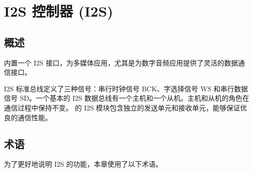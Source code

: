 \documentclass[main\_\_CN.tex]{subfiles}
\begin{document}

\ifglobal
\else
    {\let\clearpage\relax \listoftodos}
    \tableofcontents
\fi





\hypertarget{i2s}{}
\chapter{I2S 控制器 (I2S)}
\label{mod:i2s}

\section{概述}
\chipname{} 内置一个 I2S 接口，为多媒体应用，尤其是为数字音频应用提供了灵活的数据通信接口。

I2S 标准总线定义了三种信号：串行时钟信号 BCK、字选择信号 WS 和串行数据信号 SD。一个基本的 I2S 数据总线有一个主机和一个从机。主机和从机的角色在通信过程中保持不变。\chipname{} 的 I2S 模块包含独立的发送单元和接收单元，能够保证优良的通信性能。

\section{术语}

为了更好地说明 I2S 的功能，本章使用了以下术语。 
\end{document}
